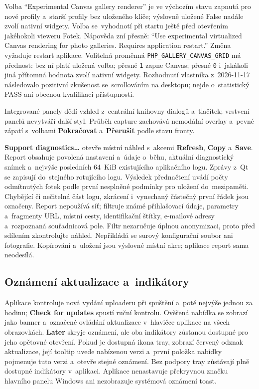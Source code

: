 \documentclass[11pt,a4paper]{article}
\newcommand{\ui}[1]{\textbf{#1}}
\newcommand{\codeword}[1]{\nolinkurl{#1}}
\begin{document}
Volba “Experimental Canvas gallery renderer” je ve výchozím stavu zapnutá
pro nové profily a~starší profily bez uloženého klíče; výslovně uložené False
nadále zvolí nativní widgety. Volba se~vyhodnotí při startu ještě před otevřením
jakéhokoli vieweru Fotek. Nápověda zní přesně:
“Use experimental virtualized Canvas rendering for photo galleries.
Requires application restart.” Změna vyžaduje restart aplikace. Volitelná
proměnná \codeword{PHP_GALLERY_CANVAS_GRID} má přednost: bez ní platí uložená
volba; přesné \codeword{1} zapne Canvas; přesné \codeword{0} i~jakákoli jiná
přítomná hodnota zvolí nativní widgety. Rozhodnutí vlastníka z~2026-11-17
následovalo pozitivní zkušenost se~scrollováním na desktopu; nejde o~statistický
PASS ani obecnou kvalifikaci přístupnosti.

Integrované panely dědí vzhled z~centrální knihovny dialogů a~tlačítek;
vrstvení panelů nevytváří další styl. Průběh capture zachovává nemodální
overlay a~pevné zápatí s~volbami \ui{Pokračovat} a~\ui{Přerušit} podle stavu fronty.

\ui{Support diagnostics…} otevře místní náhled s~akcemi \ui{Refresh},
\ui{Copy} a~\ui{Save}. Report obsahuje povolená nastavení a~údaje o~běhu,
aktuální diagnostický snímek a~nejvýše posledních 64~KiB existujícího aplikačního
logu. Zprávy z~Qt se zapisují do~stejného rotujícího logu.
Výsledek přednačtení uvádí počty odmítnutých fotek podle první nesplněné
podmínky pro uložení do~mezipaměti.
Chybějící či nečitelná část logu, zkrácení i~vynechaný částečný první
řádek jsou označeny.
Report nepoužívá síť; filtruje známé přihlašovací údaje, parametry a~fragmenty
URL, místní cesty, identifikační štítky, e-mailové adresy a~rozpoznaná
souřadnicová pole. Filtr nezaručuje úplnou anonymizaci, proto před sdílením
zkontrolujte náhled. Nepřikládá se surový konfigurační soubor ani fotografie.
Kopírování a~uložení jsou výslovné místní akce; aplikace report sama neodesílá.

\subsection{Oznámení aktualizace a~indikátory}

Aplikace kontroluje nová vydání uploaderu při spuštění a~poté nejvýše jednou
za hodinu; \ui{Check for updates} spustí ruční kontrolu. Ověřená nabídka se
zobrazí jako banner a~označené ovládání aktualizace v~hlavičce aplikace na všech
obrazovkách. \ui{Later} skryje oznámení, ale oba indikátory zůstanou dostupné
pro jeho opětovné otevření. Pokud je dostupná ikona tray, zobrazí červený odznak
aktualizace, její tooltip uvede nabízenou verzi a~první položka nabídky
pojmenuje
tuto verzi a~otevře stejné oznámení. Bez podpory tray zůstávají plně dostupné
indikátory v~aplikaci. Aplikace nenastavuje překryvnou značku hlavního panelu
Windows ani nezobrazuje systémová oznámení toast.
\end{document}
